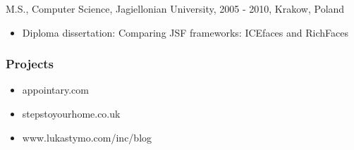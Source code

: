 \documentclass[]{rss}
\providecommand{\tightlist}{%
  \setlength{\itemsep}{0pt}\setlength{\parskip}{0pt}}
\begin{document}
\begin{resume}
M.S., Computer Science, Jagiellonian University, 2005 - 2010, Krakow,
Poland

\begin{itemize}
\tightlist
\item
  Diploma dissertation: Comparing JSF frameworks: ICEfaces and RichFaces
\end{itemize}

\subsubsection{Projects}\label{projects}

\begin{itemize}
\tightlist
\item
  appointary.com
\item
  stepstoyourhome.co.uk
\item
  www.lukastymo.com/inc/blog
\end{itemize}

\end{resume}
\end{document}
